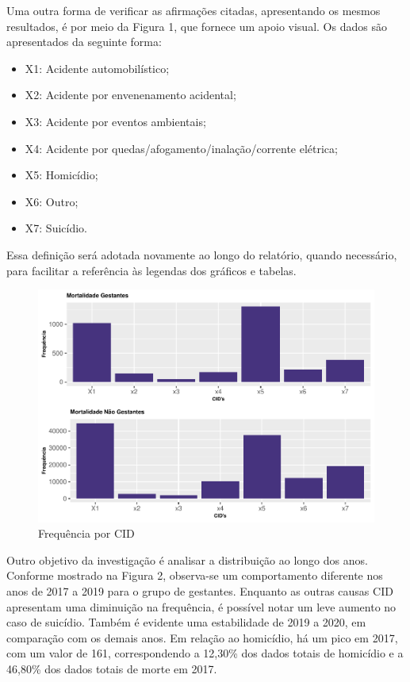 \documentclass[
]{article}
\begin{document}
Uma outra forma de verificar as afirmações citadas, apresentando os
mesmos resultados, é por meio da Figura 1, que fornece um apoio visual.
Os dados são apresentados da seguinte forma:

\begin{itemize}
\item
  X1: Acidente automobilístico;
\item
  X2: Acidente por envenenamento acidental;
\item
  X3: Acidente por eventos ambientais;
\item
  X4: Acidente por quedas/afogamento/inalação/corrente elétrica;
\item
  X5: Homicídio;
\item
  X6: Outro;
\item
  X7: Suicídio.
\end{itemize}

Essa definição será adotada novamente ao longo do relatório, quando
necessário, para facilitar a referência às legendas dos gráficos e
tabelas.

\begin{figure}
\centering
\includegraphics{RelatorioV01_files/figure-latex/unnamed-chunk-2-1.pdf}
\caption{Frequência por CID}
\end{figure}

Outro objetivo da investigação é analisar a distribuição ao longo dos
anos. Conforme mostrado na Figura 2, observa-se um comportamento
diferente nos anos de 2017 a 2019 para o grupo de gestantes. Enquanto as
outras causas CID apresentam uma diminuição na frequência, é possível
notar um leve aumento no caso de suicídio. Também é evidente uma
estabilidade de 2019 a 2020, em comparação com os demais anos. Em
relação ao homicídio, há um pico em 2017, com um valor de 161,
correspondendo a 12,30\% dos dados totais de homicídio e a 46,80\% dos
dados totais de morte em 2017.
\end{document}

